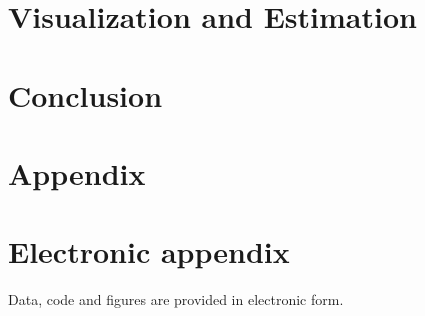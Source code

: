 \documentclass[12pt]{article}
\begin{document}
\newpage


\newpage
\section{Visualization and Estimation}\label{sec:examples}

\newpage

\section{Conclusion}\label{sec:conclusion}




\newpage

    

\setcounter{page}{5} %

\appendix

\section{Appendix}
\label{app}

\newpage

\section{Electronic appendix}
\label{el_app}

Data, code and figures are provided in electronic form.

\newpage
    

\RaggedRight


\newpage

\end{document}
